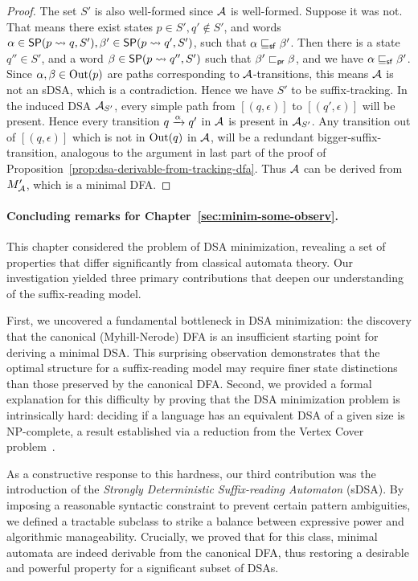 \begin{proof}
The set $S'$ is also well-formed since $\mathcal{A}$ is well-formed. Suppose it was not. That means there exist states $p \in S', q' \notin S'$, and words $\alpha \in \mathsf{SP}(p \rightsquigarrow q, S'), \beta' \in \mathsf{SP}(p \rightsquigarrow q', S')$, such that $\alpha \sqsubseteq_{\mathsf {sf}} \beta'$. Then there is a state $q'' \in S'$, and a word $\beta \in \mathsf{SP}(p \rightsquigarrow q'', S')$ such that $\beta' \sqsubset_{\mathsf {pr}} \beta$,  and we have $\alpha \sqsubseteq_{\mathsf {sf}} \beta'$. Since $\alpha,\beta \in \operatorname{Out}(p)$ are paths corresponding to $\mathcal{A}$-transitions, this means $\mathcal{A}$ is not an sDSA, which is a contradiction. Hence we have $S'$ to be suffix-tracking. In the induced DSA $\mathcal{A}_{S'}$, every simple path from $[(q, \epsilon)]$ to $[(q', \epsilon)]$ will be present. Hence every transition $q \xrightarrow{\alpha} q'$ in $\mathcal{A}$ is present in $\mathcal{A}_{S'}$. Any transition out of $[(q, \epsilon)]$ which is not in $\operatorname{Out}(q)$ in $\mathcal{A}$, will be a redundant bigger-suffix-transition, analogous to the argument in last part of the proof of Proposition~\ref{prop:dsa-derivable-from-tracking-dfa}.
 Thus $\mathcal{A}$ can be derived from $M'_{\mathcal{A}}$, which is a minimal DFA.
\end{proof}




\paragraph*{Concluding remarks for Chapter~\ref{sec:minim-some-observ}.} This chapter considered the problem of DSA minimization, revealing a set of properties that differ significantly from classical automata theory. Our investigation yielded three primary contributions that deepen our understanding of the suffix-reading model.

First, we uncovered a fundamental bottleneck in DSA minimization: the discovery that the canonical (Myhill-Nerode) DFA is an insufficient starting point for deriving a minimal DSA. This surprising observation demonstrates that the optimal structure for a suffix-reading model may require finer state distinctions than those preserved by the canonical DFA. Second, we provided a formal explanation for this difficulty by proving that the DSA minimization problem is intrinsically hard: deciding if a language has an equivalent DSA of a given size is NP-complete, a result established via a reduction from the Vertex Cover problem~\cite{DBLP:conf/coco/Karp72}.

As a constructive response to this hardness, our third contribution was the introduction of the \textit{Strongly Deterministic Suffix-reading Automaton} (sDSA). By imposing a reasonable syntactic constraint to prevent certain pattern ambiguities, we defined a tractable subclass to strike a balance between expressive power and algorithmic manageability. Crucially, we proved that for this class, minimal automata are indeed derivable from the canonical DFA, thus restoring a desirable and powerful property for a significant subset of DSAs.

